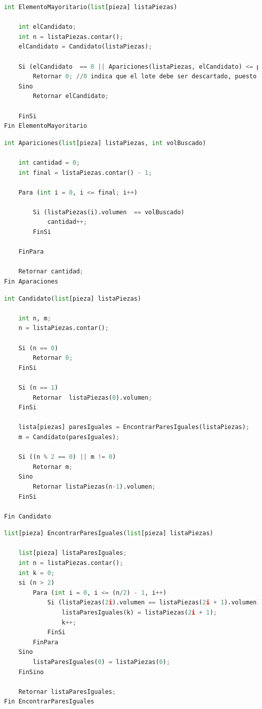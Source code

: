 \documentclass{article}
\begin{document}
\begin{lstlisting}[language=Python, caption=Algoritmo del proceso C - Elemento Mayoritario]
int ElementoMayoritario(list[pieza] listaPiezas) 

	int elCandidato;
	int n = listaPiezas.contar();
	elCandidato = Candidato(listaPiezas);

	Si (elCandidato  == 0 || Apariciones(listaPiezas, elCandidato) <= piso(n/2))
		Retornar 0; //0 indica que el lote debe ser descartado, puesto que no hay elemento mayoritario
	Sino
		Retornar elCandidato; 

	FinSi
Fin ElementoMayoritario

\end{lstlisting}
\begin{lstlisting}[language=Python, caption=Algoritmo del proceso C - Apariciones]
int Apariciones(list[pieza] listaPiezas, int volBuscado)
	
	int cantidad = 0;
	int final = listaPiezas.contar() - 1;

	Para (int i = 0, i <= final; i++)
		
		Si (listaPiezas(i).volumen  == volBuscado)
			cantidad++;
		FinSi

	FinPara

	Retornar cantidad;
Fin Aparaciones
\end{lstlisting}
\begin{lstlisting}[language=Python, caption=Algoritmo del proceso C - Candidato]
int Candidato(list[pieza] listaPiezas)

	int n, m;
	n = listaPiezas.contar();

	Si (n == 0)
		Retornar 0;
	FinSi

	Si (n == 1)
		Retornar  listaPiezas(0).volumen;
	FinSi

	lista[piezas] paresIguales = EncontrarParesIguales(listaPiezas);
	m = Candidato(paresIguales);

	Si ((n % 2 == 0) || m != 0)
		Retornar m;
	Sino
		Retornar listaPiezas(n-1).volumen;
	FinSi

Fin Candidato

\end{lstlisting}
\begin{lstlisting}[language=Python, caption=Algoritmo del proceso A]
list[pieza] EncontrarParesIguales(list[pieza] listaPiezas)

    list[pieza] listaParesIguales;
    int n = listaPiezas.contar();
    int k = 0;
    si (n > 2)
        Para (int i = 0, i <= (n/2) - 1, i++)
            Si (listaPiezas(2i).volumen == listaPiezas(2i + 1).volumen)
                listaParesIguales(k) = listaPiezas(2i + 1);
                k++;
            FinSi
        FinPara
    Sino
        listaParesIguales(0) = listaPiezas(0);
    FinSino
    
    Retornar listaParesIguales;
Fin EncontrarParesIguales

\end{lstlisting}
\end{document}
